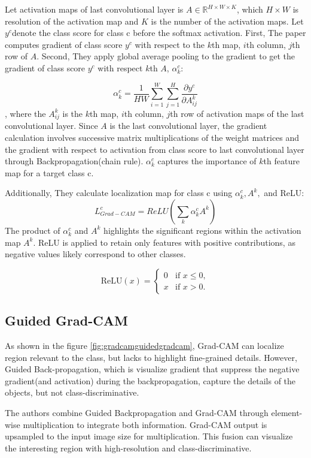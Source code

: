 \documentclass[extendedabs]{bmvc2k}
\begin{document}
Let activation maps of last convolutional layer is $A \in \mathbb{R}^{H\times W\times K}$, which $H\times W$ is resolution of the activation map and $K$ is the number of the activation maps. Let $y^c$denote the class score for class c before the softmax activation. First, The paper computes gradient of class score $y^c$ with respect to the $k$th map, $i$th column, $j$th row of $A$. Second, They apply global average pooling to the gradient to get the gradient of class score $y^c$ with respect $k$th $A$, $\alpha_k^c$:

$$
\alpha_k^c = \frac{1}{HW}\sum_{i=1}^W \sum_{j=1}^H \frac{\partial y^c}{\partial A^k_{ij}}
$$
, where the $A^k_{ij}$ is the $k$th map, $i$th column, $j$th row of activation maps of the last convolutional layer. Since $A$ is the last convolutional layer, the gradient calculation involves successive matrix multiplications of the weight matrices and the gradient with respect to activation from class score to last convolutional layer through Backpropagation(chain rule). $\alpha_k^c$ captures the importance of $k$th feature map for a target class c.

Additionally, They calculate localization map for class c using $\alpha_k^c, A^k,$ and ReLU:
$$
L^c_{Grad-CAM} = ReLU(\sum_k \alpha_k^c A^k)
$$
The product of $\alpha_k^c$ and $A^k$ highlights the significant regions within the activation map $A^k$.
ReLU is applied to retain only features with positive contributions, as negative values likely correspond to other classes.

$$
\text{ReLU}(x) =
\begin{cases} 
0 & \text{if } x \leq 0, \\
x & \text{if } x > 0.
\end{cases}
$$

\subsection{Guided Grad-CAM}
As shown in the figure \ref{fig:gradcamguidedgradcam}, Grad-CAM can localize region relevant to the class, but lacks to highlight fine-grained details. However, Guided Back-propagation\cite{guidedbackprop}, which is visualize gradient that suppress the negative gradient(and activation) during the backpropagation, capture the details of the objects, but not class-discriminative. 

The authors combine Guided Backpropagation and Grad-CAM through element-wise multiplication to integrate both information. Grad-CAM output is upsampled to the input image size for multiplication. This fusion can visualize the interesting region with high-resolution and class-discriminative.
\end{document}
